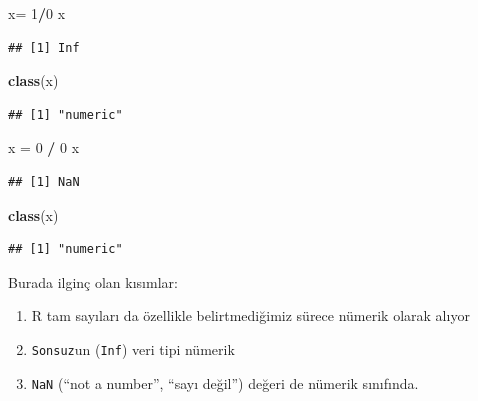 \documentclass[]{book}
\newenvironment{Shaded}{\begin{snugshade}}{\end{snugshade}}
\newcommand{\DecValTok}[1]{\textcolor[rgb]{0.00,0.00,0.81}{#1}}
\newcommand{\KeywordTok}[1]{\textcolor[rgb]{0.13,0.29,0.53}{\textbf{#1}}}
\newcommand{\NormalTok}[1]{#1}
\newcommand{\OperatorTok}[1]{\textcolor[rgb]{0.81,0.36,0.00}{\textbf{#1}}}
\newcommand{\StringTok}[1]{\textcolor[rgb]{0.31,0.60,0.02}{#1}}
\providecommand{\tightlist}{%
  \setlength{\itemsep}{0pt}\setlength{\parskip}{0pt}}
\begin{document}
\begin{Shaded}
\begin{Highlighting}[]
\NormalTok{x=}\StringTok{ }\DecValTok{1}\OperatorTok{/}\DecValTok{0}
\NormalTok{x}
\end{Highlighting}
\end{Shaded}

\begin{verbatim}
## [1] Inf
\end{verbatim}

\begin{Shaded}
\begin{Highlighting}[]
\KeywordTok{class}\NormalTok{(x)}
\end{Highlighting}
\end{Shaded}

\begin{verbatim}
## [1] "numeric"
\end{verbatim}

\begin{Shaded}
\begin{Highlighting}[]
\NormalTok{x =}\StringTok{ }\DecValTok{0} \OperatorTok{/}\StringTok{ }\DecValTok{0}
\NormalTok{x}
\end{Highlighting}
\end{Shaded}

\begin{verbatim}
## [1] NaN
\end{verbatim}

\begin{Shaded}
\begin{Highlighting}[]
\KeywordTok{class}\NormalTok{(x)}
\end{Highlighting}
\end{Shaded}

\begin{verbatim}
## [1] "numeric"
\end{verbatim}

Burada ilginç olan kısımlar:

\begin{enumerate}
\def\labelenumi{\arabic{enumi}.}
\tightlist
\item
  R tam sayıları da özellikle belirtmediğimiz sürece nümerik olarak
  alıyor
\item
  \texttt{Sonsuz}un (\texttt{Inf}) veri tipi nümerik
\item
  \texttt{NaN} (``not a number'', ``sayı değil'') değeri de nümerik
  sınıfında.
\end{enumerate}
\end{document}

